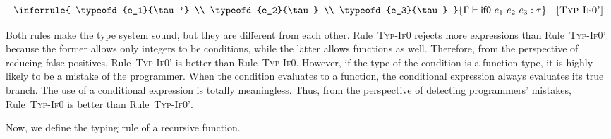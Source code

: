 
\vspace{-1em}

\[
  \inferrule
  { \typeofd{e_1}{\tau'} \\
    \typeofd{e_2}{\tau} \\
    \typeofd{e_3}{\tau} }
  { \typeofd{\eifz{e_1}{e_2}{e_3}}{\tau} }
  \quad\textsc{[Typ-If0']}
\]

Both rules make the type system sound, but they are different from each other.
Rule~\textsc{Typ-If0} rejects more expressions than Rule~\textsc{Typ-If0'}
because the former allows only integers to be conditions, while the latter
allows functions as well. Therefore, from the perspective of reducing false positives,
Rule~\textsc{Typ-If0'} is better than Rule~\textsc{Typ-If0}.
However, if the type of the condition is a function type, it is highly likely to
be a mistake of the programmer. When the condition evaluates to a function, the
conditional expression always evaluates its true branch. The use of a
conditional expression is totally meaningless. Thus, from the perspective of
detecting programmers' mistakes, Rule~\textsc{Typ-If0} is better than
Rule~\textsc{Typ-If0'}.

Now, we define the typing rule of a recursive function.


\vspace{-1em}

